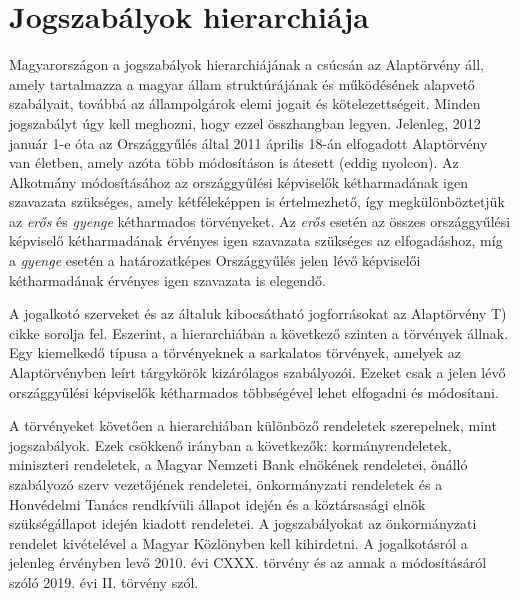 \section{Jogszabályok hierarchiája}

Magyarországon a jogszabályok hierarchiájának a csúcsán az Alaptörvény áll, amely tartalmazza a magyar állam struktúrájának és működésének alapvető szabályait, továbbá az állampolgárok elemi jogait és kötelezettségeit. Minden jogszabályt úgy kell meghozni, hogy ezzel összhangban legyen. Jelenleg, 2012 január 1-e óta az Országgyűlés által 2011 április 18-án elfogadott Alaptörvény van életben, amely azóta több módosításon is átesett (eddig nyolcon). Az Alkotmány módosításához az országgyűlési képviselők kétharmadának igen szavazata szükséges, amely kétféleképpen is értelmezhető, így megkülönböztetjük az \textit{erős} és \textit{gyenge} kétharmados törvényeket. Az \textit{erős} esetén az összes országgyűlési képviselő kétharmadának érvényes igen szavazata szükséges az elfogadáshoz, míg a \textit{gyenge} esetén a határozatképes Országgyűlés jelen lévő képviselői kétharmadának érvényes igen szavazata is elegendő.

A jogalkotó szerveket és az általuk kibocsátható jogforrásokat az Alaptörvény T) cikke sorolja fel. Eszerint, a hierarchiában a következő szinten a törvények állnak. Egy kiemelkedő típusa a törvényeknek a sarkalatos törvények, amelyek az Alaptörvényben leírt tárgykörök kizárólagos szabályozói. Ezeket csak  a jelen lévő országgyűlési képviselők kétharmados többségével lehet elfogadni és módosítani.

A törvényeket követően a hierarchiában különböző rendeletek szerepelnek, mint jogszabályok. Ezek csökkenő irányban a következők: kormányrendeletek, miniszteri rendeletek, a Magyar Nemzeti Bank elnökének rendeletei, önálló szabályozó szerv vezetőjének rendeletei, önkormányzati rendeletek és a Honvédelmi Tanács rendkívüli állapot idején és a köztársasági elnök szükségállapot idején kiadott rendeletei. A jogszabályokat az önkormányzati rendelet kivételével a Magyar Közlönyben kell kihirdetni. A jogalkotásról a jelenleg érvényben levő 2010. évi CXXX. törvény és az annak a módosításáról szóló 2019. évi II. törvény szól. \cite{jog-hierarchiaja, alaptorveny, 2010-CXXX, 2019-II}